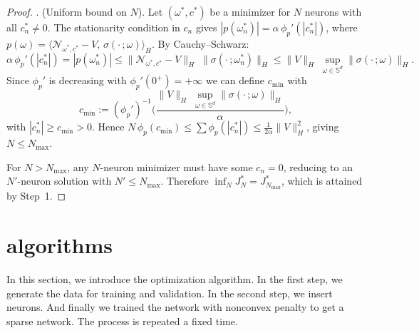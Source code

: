 \documentclass[12pt,fleqn]{amsart}
\theoremstyle{definition}
\begin{document}
\begin{proof}
\medskip{}. (Uniform bound on $N$).
Let $(\omega^*, c^*)$ be a minimizer for $N$ neurons with all $c_n^* \neq 0$. The stationarity condition in $c_n$ gives $|p(\omega_n^*)| = \alpha\,\phi_p'(|c_n^*|)$, where $p(\omega) = \langle \mathcal{N}_{\omega^*, c^*} - V,\, \sigma(\cdot\,;\omega)\rangle_H$.
By Cauchy--Schwarz:
\[
	\alpha\,\phi_p'(|c_n^*|) = |p(\omega_n^*)| \le \|\mathcal{N}_{\omega^*, c^*} - V\|_H \;\|\sigma(\cdot\,;\omega_n^*)\|_H \le \|V\|_H\;\sup_{\omega \in \mathbb{S}^d}\|\sigma(\cdot\,;\omega)\|_H.
\]
Since $\phi_p'$ is decreasing with $\phi_p'(0^+) = +\infty$ we can define $c_{\min}$ with
\begin{equation*}
	c_{\min} := (\phi_p')^{-1}\!\bigg(\frac{\|V\|_H\;\sup_{\omega \in \mathbb{S}^d}\|\sigma(\cdot\,;\omega)\|_H}{\alpha}\bigg),
\end{equation*}
with $|c_n^*| \ge c_{\min} > 0$.
Hence $N\,\phi_p(c_{\min}) \le \sum \phi_p(|c_n^*|) \le \frac{1}{2\alpha}\|V\|_H^2$, giving $N \le N_{\max}$.

For $N > N_{\max}$, any $N$-neuron minimizer must have some $c_n = 0$, reducing to an $N'$-neuron solution with $N' \le N_{\max}$.
Therefore $\inf_N J_N^* = J_{N_{\max}}^*$, which is attained by Step~1.
\end{proof}



\section{algorithms}
In this section, we introduce the optimization algorithm. In the first step, we generate the data for training and validation. In the second step, we insert neurons. And finally we trained the network with nonconvex penalty to get a sparse network. The process is repeated a fixed time. 
\end{document}
